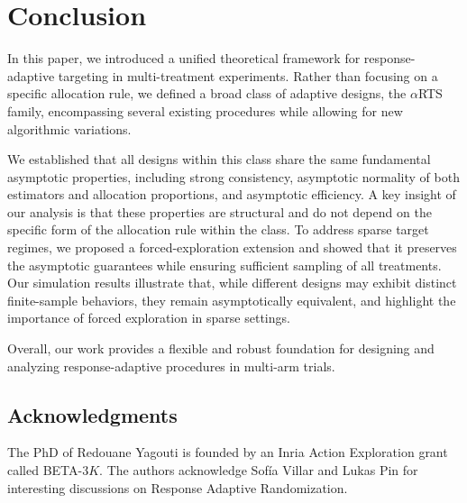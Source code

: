 \documentclass[11pt]{article}
\theoremstyle{plain}
\theoremstyle{definition}
\begin{document}
	
	\section{Conclusion}\label{sec:conclusion}
	In this paper, we introduced a unified theoretical framework for response-adaptive targeting in multi-treatment experiments. Rather than focusing on a specific allocation rule, we defined a broad class of adaptive designs, the $\alpha$RTS family, encompassing several existing procedures while allowing for new algorithmic variations.
	
	We established that all designs within this class share the same fundamental asymptotic properties, including strong consistency, asymptotic normality of both estimators and allocation proportions, and asymptotic efficiency. A key insight of our analysis is that these properties are structural and do not depend on the specific form of the allocation rule within the class. To address sparse target regimes, we proposed a forced-exploration extension and showed that it preserves the asymptotic guarantees while ensuring sufficient sampling of all treatments. Our simulation results illustrate that, while different designs may exhibit distinct finite-sample behaviors, they remain asymptotically equivalent, and highlight the importance of forced exploration in sparse settings.
	
	Overall, our work provides a flexible and robust foundation for designing and analyzing response-adaptive procedures in multi-arm trials.
	
	\subsection*{Acknowledgments}
		The PhD of Redouane Yagouti is founded by an Inria Action Exploration grant called BETA-3$K$. The authors acknowledge Sof\'ia Villar and Lukas Pin for interesting discussions on Response Adaptive Randomization.

	
	
	
\end{document}
